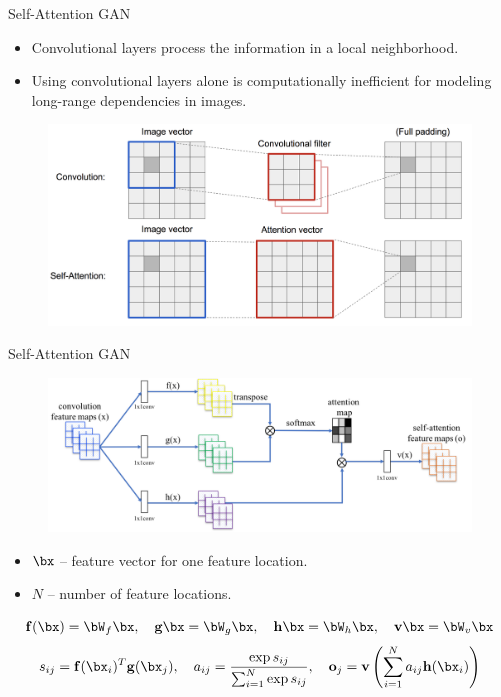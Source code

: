 \begin{frame}{Self-Attention GAN}
	\begin{itemize}
		\item Convolutional layers process the information in a local neighborhood.
		\item Using convolutional layers alone is computationally inefficient for modeling long-range dependencies in images.
	\end{itemize}
	\begin{figure}
		\centering
		\includegraphics[width=0.9\linewidth]{figs/conv-vs-sa}
	\end{figure}
\end{frame}
\begin{frame}{Self-Attention GAN}
	\begin{figure}
		\centering
		\includegraphics[width=0.9\linewidth]{figs/self-attention}
	\end{figure}
	\vspace{-0.2cm}
	\begin{itemize}
		\item $\bx$ -- feature vector for one feature location.
		\item $N$ -- number of feature locations.
	\end{itemize}
	\vspace{0.5cm}
	\[
		\mathbf{f}(\bx) = \bW_f \bx, \quad \mathbf{g}\bx = \bW_g\bx, \quad \mathbf{h}\bx = \bW_h\bx, \quad \mathbf{v}\bx = \bW_v\bx
	\]
	\[
		s_{ij} = \mathbf{f}(\bx_i)^T \mathbf{g}(\bx_j), \quad a_{ij} = \frac{\exp{s_{ij}}}{\sum_{i=1}^N \exp{s_{ij}}}, \quad \textbf{o}_j = \textbf{v}\left( \sum_{i=1}^N a_{ij} \mathbf{h}(\bx_i) \right)
	\]
\end{frame}
